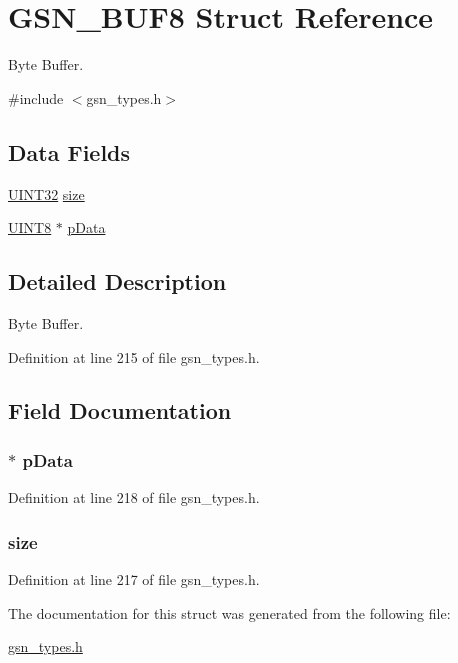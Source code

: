 \hypertarget{a00033}{
\section{GSN\_\-BUF8 Struct Reference}
\label{a00033}
}


Byte Buffer.  




{\ttfamily \#include $<$gsn\_\-types.h$>$}

\subsection*{Data Fields}
\begin{DoxyCompactItemize}
\item 
\hyperlink{a00660_gae1e6edbbc26d6fbc71a90190d0266018}{UINT32} \hyperlink{a00033_a6d4bac4be8d2f0ee400eb63ac2204aac}{size}
\item 
\hyperlink{a00660_gab27e9918b538ce9d8ca692479b375b6a}{UINT8} $\ast$ \hyperlink{a00033_a7be59affc41399499f2f3ae7ef3ebb15}{pData}
\end{DoxyCompactItemize}


\subsection{Detailed Description}
Byte Buffer. 

Definition at line 215 of file gsn\_\-types.h.



\subsection{Field Documentation}
\hypertarget{a00033_a7be59affc41399499f2f3ae7ef3ebb15}{
\subsubsection[{pData}]{$\ast$ {\bf pData}}}
\label{a00033_a7be59affc41399499f2f3ae7ef3ebb15}


Definition at line 218 of file gsn\_\-types.h.

\hypertarget{a00033_a6d4bac4be8d2f0ee400eb63ac2204aac}{
\subsubsection[{size}]{ {\bf size}}}
\label{a00033_a6d4bac4be8d2f0ee400eb63ac2204aac}


Definition at line 217 of file gsn\_\-types.h.



The documentation for this struct was generated from the following file:\begin{DoxyCompactItemize}
\item 
\hyperlink{a00599}{gsn\_\-types.h}\end{DoxyCompactItemize}
